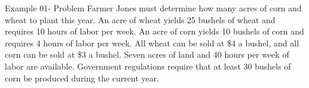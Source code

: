 \begin{frame}{Example 01- Problem}
Farmer Jones must determine how many acres of corn and wheat to plant this year.
An acre of wheat yields 25 bushels of wheat and requires 10 hours of labor per
week. An acre of corn yields 10 bushels of corn and requires 4 hours of labor
per week. All wheat can be sold at \$4 a bushel, and all corn can be sold at
\$3 a bushel. Seven acres of land and 40 hours per week of labor are available.
Government regulations require that at least 30 bushels of corn be produced
during the current year.
\end{frame}
